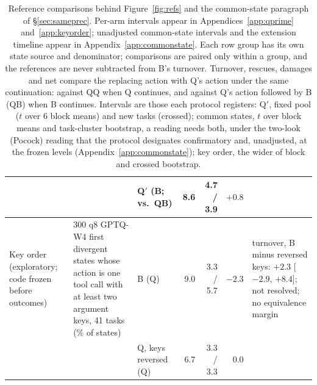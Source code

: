 \begin{table}[t]
\begin{tabular}{@{}P{2.1cm}P{2.9cm}P{1.8cm}rrrP{4.7cm}@{}}
 & & \raggedright Q$'$ (B; vs.\ QB) & 8.6 & 4.7 / 3.9 & $+0.8$ & \tabularnewline
\midrule
\raggedright Key order (exploratory; code frozen before outcomes) & \raggedright 300 q8 GPTQ-W4 first divergent states whose action is one tool call with at least two argument keys, 41 tasks (\% of states) & \raggedright B (Q) & 9.0 & 3.3 / 5.7 & $-2.3$ & \raggedright turnover, B minus reversed keys: $+2.3$ [$-2.9$, $+8.4$]; not resolved; no equivalence margin \tabularnewline
 & & \raggedright Q, keys reversed (Q) & 6.7 & 3.3 / 3.3 & $0.0$ & \tabularnewline
\bottomrule
\end{tabular}
\caption{Reference comparisons behind Figure~\ref{fig:refs} and the common-state paragraph of \S\ref{sec:sameprec}. Per-arm intervals appear in Appendices~\ref{app:qprime} and~\ref{app:keyorder}; unadjusted common-state intervals and the extension timeline appear in Appendix~\ref{app:commonstate}. Each row group has its own state source and denominator; comparisons are paired only within a group, and the references are never subtracted from B's turnover. Turnover, rescues, damages and net compare the replacing action with Q's action under the same continuation: against QQ when Q continues, and against Q's action followed by B (QB) when B continues. Intervals are those each protocol registers: Q$'$, fixed pool ($t$ over 6 block means) and new tasks (crossed); common states, $t$ over block means and task-cluster bootstrap, a reading needs both, under the two-look (Pocock) reading that the protocol designates confirmatory and, unadjusted, at the frozen levels (Appendix~\ref{app:commonstate}); key order, the wider of block and crossed bootstrap.}
\label{tab:refsfull}
\end{table}


